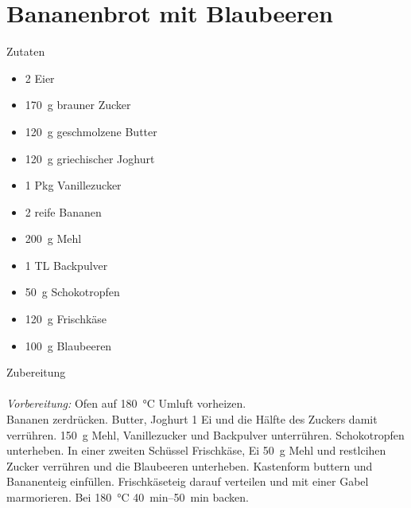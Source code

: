 \section*{Bananenbrot mit Blaubeeren}
\ihead{}\ohead{}
\cfoot{}
{\Large Zutaten}
\begin{multicols}{2}
\begin{itemize}
    \item \num{2} Eier
    \item \SI{170}{g} brauner Zucker
    \item \SI{120}{g} geschmolzene Butter
    \item \SI{120}{g} griechischer Joghurt
    \item \num{1} Pkg Vanillezucker
    \item \num{2} reife Bananen
    \item \SI{200}{g} Mehl
    \item \num{1} TL Backpulver
    \item \SI{50}{g} Schokotropfen
    \item \SI{120}{g} Frischkäse
    \item \SI{100}{g} Blaubeeren
\end{itemize}
\end{multicols}
\noindent
{\Large Zubereitung}\\
\\
\textit{Vorbereitung:} Ofen auf \SI{180}{\celsius} Umluft vorheizen.\\
Bananen zerdrücken.
Butter, Joghurt \num{1} Ei und die Hälfte des Zuckers damit verrühren.
\SI{150}{g} Mehl, Vanillezucker und Backpulver unterrühren.
Schokotropfen unterheben.
In einer zweiten Schüssel Frischkäse, Ei \SI{50}{g} Mehl und restlcihen Zucker verrühren und die Blaubeeren unterheben.
Kastenform buttern und Bananenteig einfüllen. 
Frischkäseteig darauf verteilen und mit einer Gabel marmorieren.
Bei \SI{180}{\celsius} \SIrange{40}{50}{min} backen.